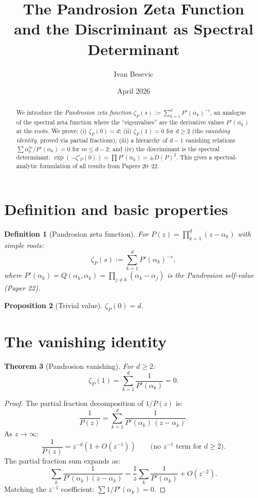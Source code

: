 \documentclass[11pt]{article}
\title{The Pandrosion Zeta Function\\
and the Discriminant as Spectral Determinant}
\author{Ivan Besevic}
\date{April 2026}
\newtheorem{theorem}{Theorem}[section]
\newtheorem{proposition}[theorem]{Proposition}
\newtheorem{definition}[theorem]{Definition}
\begin{document}
\maketitle

\begin{abstract}
We introduce the \emph{Pandrosion zeta function}
$\zeta_P(s) := \sum_{k=1}^{d} P'(\alpha_k)^{-s}$,
an analogue of the spectral zeta function where the ``eigenvalues'' are the
derivative values $P'(\alpha_k)$ at the roots. We prove:
(i) $\zeta_P(0) = d$;
(ii) $\zeta_P(1) = 0$ for $d \geq 2$ (the \emph{vanishing identity}, proved via partial
fractions);
(iii) a hierarchy of $d-1$ vanishing relations $\sum \alpha_k^m / P'(\alpha_k) = 0$
for $m \leq d-2$;
and (iv) the discriminant is the spectral determinant:
$\exp(-\zeta'_P(0)) = \prod P'(\alpha_k) = \pm D(P)^2$.
This gives a spectral-analytic formulation of all results from Papers 20--22.
\end{abstract}

\section{Definition and basic properties}

\begin{definition}[Pandrosion zeta function]
For $P(z) = \prod_{k=1}^{d}(z-\alpha_k)$ with simple roots:
\begin{equation}
\zeta_P(s) := \sum_{k=1}^{d} P'(\alpha_k)^{-s},
\end{equation}
where $P'(\alpha_k) = Q(\alpha_k,\alpha_k) = \prod_{j \neq k}(\alpha_k - \alpha_j)$
is the Pandrosion self-value (Paper 22).
\end{definition}

\begin{proposition}[Trivial value]
$\zeta_P(0) = d$.
\end{proposition}

\section{The vanishing identity}

\begin{theorem}[Pandrosion vanishing]
For $d \geq 2$:
\begin{equation}
\boxed{\zeta_P(1) = \sum_{k=1}^{d} \frac{1}{P'(\alpha_k)} = 0.}
\end{equation}
\end{theorem}

\begin{proof}
The partial fraction decomposition of $1/P(z)$ is:
\begin{equation}
\frac{1}{P(z)} = \sum_{k=1}^{d} \frac{1}{P'(\alpha_k)\,(z - \alpha_k)}.
\end{equation}
As $z \to \infty$:
\[
\frac{1}{P(z)} = z^{-d}(1 + O(z^{-1})) \qquad \text{(no $z^{-1}$ term for $d \geq 2$).}
\]
The partial fraction sum expands as:
\[
\sum_k \frac{1}{P'(\alpha_k)(z - \alpha_k)}
= \frac{1}{z}\sum_k \frac{1}{P'(\alpha_k)} + O(z^{-2}).
\]
Matching the $z^{-1}$ coefficient: $\sum 1/P'(\alpha_k) = 0$.
\end{proof}
\end{document}
